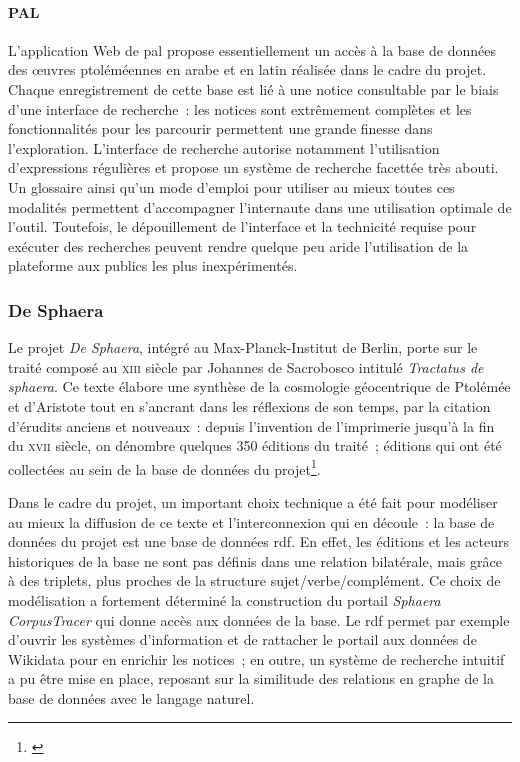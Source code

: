 \documentclass[a4paper,12pt,twoside]{book}
\newcommand{\eng}{\emph}
\newcommand{\XIII}{\textsc{xiii}\ieme{}\xspace}
\newcommand{\XVII}{\textsc{xvii}\ieme{}\xspace}
\newcommand{\pal}{\gls{pal}\xspace}
\newcommand{\rdf}{\gls{rdf}\xspace}
\begin{document}
				\paragraph{PAL}
L'application Web de \pal propose essentiellement un accès à la base de données des œuvres ptoléméennes en arabe et en latin réalisée dans le cadre du projet. Chaque enregistrement de cette base est lié à une notice consultable par le biais d'une interface de recherche~: les notices sont extrêmement complètes et les fonctionnalités pour les parcourir permettent une grande finesse dans l'exploration. L'interface de recherche autorise notamment l'utilisation d'expressions régulières et propose un système de recherche facettée très abouti. Un glossaire ainsi qu’un mode d'emploi pour utiliser au mieux toutes ces modalités permettent d'accompagner l'internaute dans une utilisation optimale de l'outil. Toutefois, le dépouillement de l'interface et la technicité requise pour exécuter des recherches peuvent rendre quelque peu aride l'utilisation de la plateforme aux publics les plus inexpérimentés.

			\subsubsection{De Sphaera}
Le projet \eng{De Sphaera}, intégré au Max-Planck-Institut de Berlin, porte sur le traité composé au \XIII siècle par Johannes de Sacrobosco intitulé \emph{Tractatus de sphaera}. Ce texte élabore une synthèse de la cosmologie géocentrique de Ptolémée et d'Aristote tout en s'ancrant dans les réflexions de son temps, par la citation d'érudits anciens et nouveaux~: depuis l'invention de l'imprimerie jusqu'à la fin du \XVII siècle, on dénombre quelques 350 éditions du traité~; éditions qui ont été collectées au sein de la base de données du projet\footnote{\cite{vallerianiSphaeraModelingData2017}}.

Dans le cadre du projet, un important choix technique a été fait pour modéliser au mieux la diffusion de ce texte et l'interconnexion qui en découle~: la base de données du projet est une base de données \rdf. En effet, les éditions et les acteurs historiques de la base ne sont pas définis dans une relation bilatérale, mais grâce à des triplets, plus proches de la structure sujet/verbe/complément. Ce choix de modélisation a fortement déterminé la construction du portail \emph{Sphaera CorpusTracer} qui donne accès aux données de la base. Le \rdf permet par exemple d'ouvrir les systèmes d'information et de rattacher le portail aux données de Wikidata pour en enrichir les notices~; en outre, un système de recherche intuitif a pu être mise en place, reposant sur la similitude des relations en graphe de la base de données avec le langage naturel.\\
\end{document}
